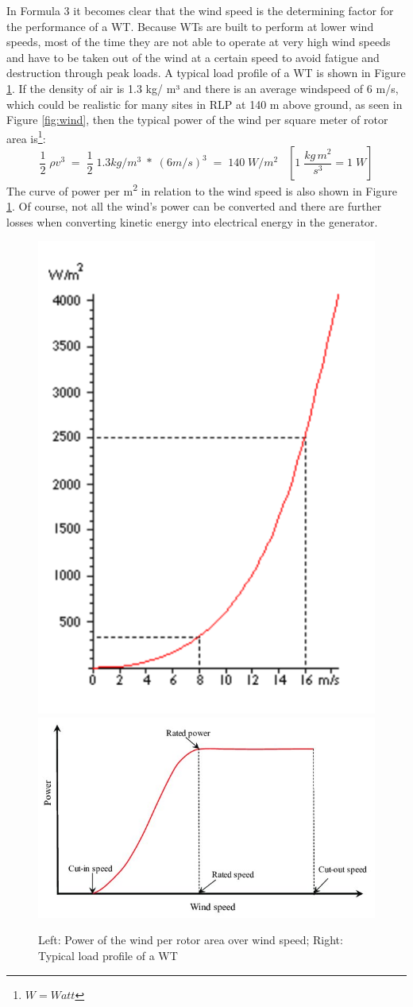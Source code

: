 \documentclass[a4paper,11pt]{article}
\begin{document}
In Formula 3 it becomes clear that the wind speed is the determining factor for the performance of a WT. Because WTs are built to perform at lower wind speeds, most of the time they are not able to operate at very high wind speeds and have to be taken out of the wind at a certain speed to avoid fatigue and destruction through peak loads. A typical load profile of a WT is shown in Figure \ref{fig:powerofwind}. If the density of air is 1.3 kg/ m³ and there is an average windspeed of 6 m/s, which could be realistic for many sites in RLP at 140 m above ground, as seen in Figure \ref{fig:wind}, then the typical power of the wind per square meter of rotor area is\footnote{\(W= Watt\)}:
\begin{equation}
\frac{1}{2}\; \rho v^3\;=\;\frac{1}{2}\;1.3 kg/m^3\; *\; (6 m/s)^3\;=\;140\; W/m^2\;\;\; [1\; \frac{kg\, m^2}{s^3} = 1\; W]
\end{equation}
The curve of power per m\textsuperscript{2} in relation to the wind speed is also shown in Figure \ref{fig:powerofwind}. Of course, not all the wind's power can be converted and there are further losses when converting kinetic energy into electrical energy in the generator.
\begin{figure}

{\centering \includegraphics[width=0.49\linewidth,height=0.25\textheight]{figures/power2} \includegraphics[width=0.49\linewidth,height=0.25\textheight]{figures/Typical-wind-power-output-versus-wind-speed_W640} 

}

\caption{Left: Power of the wind per rotor area over wind speed; Right: Typical load profile of a WT}\label{fig:powerofwind}
\end{figure}
\end{document}
